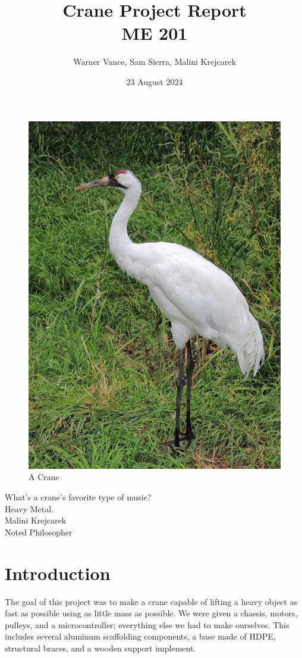 \documentclass[letterpaper, 12pt]{article}
\title{%
    Crane Project Report \\
\large ME 201
}
\author{Warner Vance, Sam Sierra, Malini Krejcarek}
\date{23 August 2024}
\begin{document}
\maketitle
\begin{figure}[H]
    \centering
    \includegraphics[scale = 0.1]{American Crane Sasata.jpg}
    \caption{A Crane}
\end{figure}
\begin{center}
    \LARGE What's a crane's favorite type of music?\\
    \Large Heavy Metal. \\
    \footnotesize Malini Krejcarek \\
    \tiny Noted Philosopher \\
\end{center}

    

\section{Introduction}
The goal of this project was to make a crane capable of lifting a heavy object as fast as possible using as little mass as possible. 
We were given a chassis, motors, pulleys,  and a microcontroller; everything else we had to make ourselves. 
This includes several aluminum scaffolding components, a base made of HDPE, structural braces, and a wooden support implement. 
\end{document}
